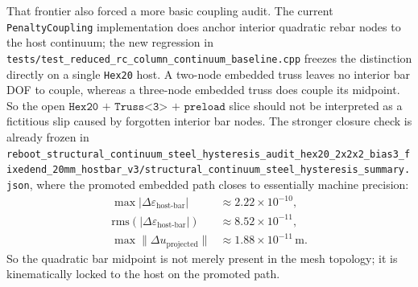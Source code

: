 That frontier also forced a more basic coupling audit. The current
\texttt{PenaltyCoupling} implementation does anchor interior quadratic rebar
nodes to the host continuum; the new regression in
\texttt{tests/test\_reduced\_rc\_column\_continuum\_baseline.cpp} freezes the
distinction directly on a single \texttt{Hex20} host. A two-node embedded truss
leaves no interior bar DOF to couple, whereas a three-node embedded truss does
couple its midpoint. So the open
\(\texttt{Hex20 + Truss<3> + preload}\) slice should not be interpreted as a
fictitious slip caused by forgotten interior bar nodes. The stronger closure
check is already frozen in
\texttt{reboot\_structural\_continuum\_steel\_hysteresis\_audit\_hex20\_2x2x2\_bias3\_fixedend\_20mm\_hostbar\_v3/structural\_continuum\_steel\_hysteresis\_summary.json},
where the promoted embedded path closes to essentially machine precision:
\[
\begin{aligned}
\max |\Delta \varepsilon_{\text{host-bar}}| &\approx 2.22\times10^{-10},\\
\mathrm{rms}(|\Delta \varepsilon_{\text{host-bar}}|) &\approx 8.52\times10^{-11},\\
\max \|\Delta u_{\text{projected}}\| &\approx 1.88\times10^{-11}\,\mathrm{m}.
\end{aligned}
\]
So the quadratic bar midpoint is not merely present in the mesh topology; it is
kinematically locked to the host on the promoted path.

